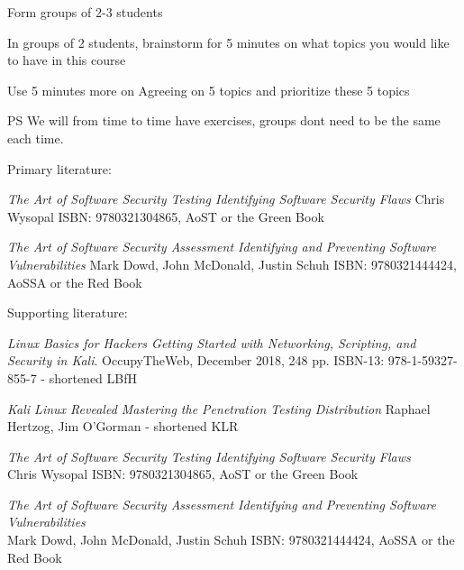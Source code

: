 \documentclass[Screen16to9,17pt]{foils}
\begin{document}


Form groups of 2-3 students

In groups of 2 students, brainstorm for 5 minutes on what topics you would like to have in this course

Use 5 minutes more on Agreeing on 5 topics and prioritize these 5 topics

\vskip 1cm
PS We will from time to time have exercises, groups dont need to be the same each time.


Primary literature:
\begin{list2}
\item \emph{The Art of Software Security Testing Identifying Software Security Flaws}
Chris Wysopal ISBN: 9780321304865, AoST or the Green Book
\item \emph{The Art of Software Security Assessment Identifying and Preventing
Software Vulnerabilities}
Mark Dowd, John McDonald, Justin Schuh ISBN: 9780321444424, AoSSA or the Red Book
\end{list2}
Supporting literature:
\begin{list2}
\item \emph{Linux Basics for Hackers Getting Started with Networking, Scripting, and Security in Kali}. OccupyTheWeb, December 2018, 248 pp. ISBN-13: 978-1-59327-855-7 - shortened LBfH
\item \emph{Kali Linux Revealed  Mastering the Penetration Testing Distribution}
Raphael Hertzog, Jim O'Gorman - shortened KLR
\end{list2}



\emph{The Art of Software Security Testing Identifying Software Security Flaws}\\
Chris Wysopal ISBN: 9780321304865, AoST or the Green Book



\emph{The Art of Software Security Assessment Identifying and Preventing
Software Vulnerabilities}\\
Mark Dowd, John McDonald, Justin Schuh ISBN: 9780321444424, AoSSA or the Red Book
\end{document}
